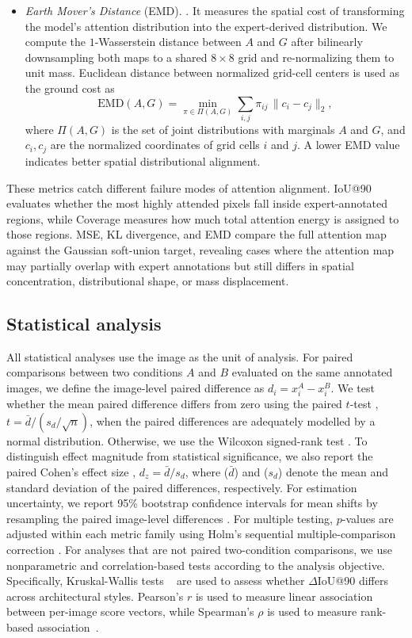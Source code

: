\documentclass[lineno,pdflatex,sn-mathphys-num]{sn-jnl}%
\theoremstyle{thmstyleone}%
\theoremstyle{thmstyletwo}%
\theoremstyle{thmstylethree}%
\begin{document}
\begin{itemize}
\item \textit{Earth Mover's Distance} (EMD). \cite{Rubner2000}. It measures the spatial cost of transforming the model's attention distribution into the expert-derived distribution. We compute the $1$-Wasserstein distance between $A$ and $G$ after bilinearly downsampling both maps to a shared $8 \times 8$ grid and re-normalizing them to unit mass. Euclidean distance between normalized grid-cell centers is used as the ground cost as
\begin{equation}
\mathrm{EMD}(A, G) = \min_{\pi \in \Pi(A, G)}
\sum_{i,j} \pi_{ij} \, \|c_i - c_j\|_2,
\end{equation}
where $\Pi(A, G)$ is the set of joint distributions with marginals $A$ and $G$, and $c_i, c_j$ are the normalized coordinates of grid cells $i$ and $j$. A lower EMD value indicates better spatial distributional alignment.
\end{itemize}

These metrics catch different failure modes of attention alignment. IoU@90 evaluates whether the most highly attended pixels fall inside expert-annotated regions, while Coverage measures how much total attention energy is assigned to those regions. MSE, KL divergence, and EMD compare the full attention map against the Gaussian soft-union target, revealing cases where the attention map may partially overlap with expert annotations but still differs in spatial concentration, distributional shape, or mass displacement.

\subsection{Statistical analysis}

All statistical analyses use the image as the unit of analysis. For paired comparisons between two conditions $A$ and $B$ evaluated on the same annotated images, we define the image-level paired difference as $d_i=x_i^A-x_i^B$. We test whether the mean paired difference differs from zero using the paired $t$-test \cite{SciPy}, $t=\bar d/(s_d/\sqrt n)$, when the paired differences are adequately modelled by a normal distribution. Otherwise, we use the Wilcoxon signed-rank test \cite{SciPy}. To distinguish effect magnitude from statistical significance, we also report the paired Cohen's effect size \cite{Cohen1988, Lakens2013}, $d_z=\bar d/s_d$, where ($\bar d$) and ($s_d$) denote the mean and standard deviation of the paired differences, respectively. For estimation uncertainty, we report 95\% bootstrap confidence intervals for mean shifts by resampling the paired image-level differences \cite{SciPy}. For multiple testing, $p$-values are adjusted within each metric family using Holm's sequential multiple-comparison correction \cite{Holm1979}. For analyses that are not paired two-condition comparisons, we use nonparametric and correlation-based tests according to the analysis objective. Specifically, Kruskal-Wallis tests ~\cite{SciPy} are used to assess whether $\Delta$IoU@90 differs across architectural styles. Pearson's $r$ is used to measure linear association between per-image score vectors, while Spearman's $\rho$ is used to measure rank-based association~\cite{SciPy}.
\end{document}
